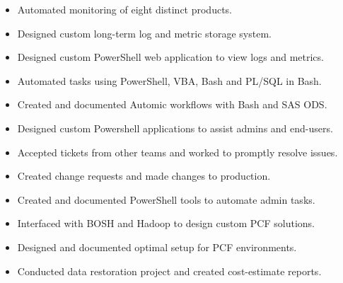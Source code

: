 \documentclass[10pt,a4paper]{altacv}
\begin{document}
\medskip


\begin{itemize}
    \setlength{\itemindent}{0.5em}
    \item   \small{Automated monitoring of eight distinct products.}
    \item   \small{Designed custom long-term log and metric storage system.}
    \item   \small{Designed custom PowerShell web application to view logs and metrics.}
\end{itemize}

\medskip


\begin{itemize}
    \setlength{\itemindent}{0.5em}
    \item   \small{Automated tasks using PowerShell, VBA, Bash and PL/SQL in Bash.}
    \item   \small{Created and documented Automic workflows with Bash and SAS ODS.}
    \item   \small{Designed custom Powershell applications to assist admins and end-users.}
\end{itemize}

\medskip


\begin{itemize}
    \setlength{\itemindent}{0.5em}
    \item   \small{Accepted tickets from other teams and worked to promptly resolve issues.}
    \item   \small{Created change requests and made changes to production.}
    \item   \small{Created and documented PowerShell tools to automate admin tasks.}
\end{itemize}

\medskip


\begin{itemize}
    \setlength{\itemindent}{0.5em}
    \item   \small{Interfaced with BOSH and Hadoop to design custom PCF solutions.}
    \item   \small{Designed and documented optimal setup for PCF environments.}
    \item   \small{Conducted data restoration project and created cost-estimate reports.}
\end{itemize}
\end{document}
